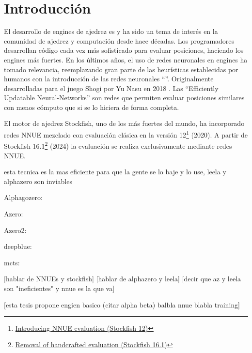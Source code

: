\section*{Introducción}

El desarrollo de engines de ajedrez es y ha sido un tema de interés en la comunidad de ajedrez y computación desde hace décadas. Los programadores desarrollan código cada vez más sofisticado para evaluar posiciones, haciendo los engines más fuertes. En los últimos años, el uso de redes neuronales en engines ha tomado relevancia, reemplazando gran parte de las heurísticas establecidas por humanos con la introducción de las redes neuronales ``''. Originalmente desarrolladas para el juego Shogi por Yu Nasu en 2018 \cite{nnue:2018}. Las ``Efficiently Updatable Neural-Networks'' son redes que permiten evaluar posiciones similares con menos cómputo que si se lo hiciera de forma completa.

El motor de ajedrez Stockfish, uno de los más fuertes del mundo, ha incorporado redes NNUE mezclado con evaluación clásica en la versión 12\footnote[1]{\href{https://stockfishchess.org/blog/2020/introducing-nnue-evaluation/}{Introducing NNUE evaluation (Stockfish 12)}} (2020). A partir de Stockfish 16.1\footnote[2]{\href{https://stockfishchess.org/blog/2024/stockfish-16-1/}{Removal of handcrafted evaluation (Stockfish 16.1)}} (2024) la evaluación se realiza exclusivamente mediante redes NNUE.


esta tecnica es la mas eficiente para que la gente se lo baje y lo use, leela y alphazero son inviables

Alphagozero: \cite{alphagozero:2017}

Azero: \cite{alphazero:2017}

Azero2: \cite{alphazero:2018}

deepblue: \cite{deepblue:2002}

mcts: \cite{mcts-survey:2012}

[hablar de NNUEs y stockfish]
[hablar de alphazero y leela]
[decir que az y leela son "ineficientes" y nnue es la que va]

[esta tesis propone engien basico (citar alpha beta) balbla nnue blabla training]

